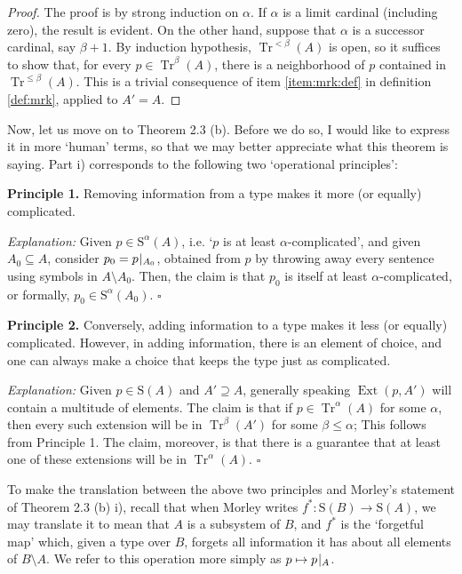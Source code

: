 \documentclass{article}
\theoremstyle{nonumberplain}
\newtheorem{proof}{Proof}
\newcommand{\Stone}{\mathrm{S}}
\DeclareMathOperator{\Tr}{Tr}
\DeclareMathOperator{\Ext}{Ext}
\newcommand{\rst}[2]{#1\mspace{1.3mu plus 0.5mu minus 0.5mu}|_{#2}}
\begin{document}
\begin{proof}
The proof is by strong induction on $\alpha$. If $\alpha$ is a limit cardinal (including zero), the result is evident. On the other hand, suppose that $\alpha$ is a successor cardinal, say $\beta + 1$. By induction hypothesis, $\Tr^{<\beta}(A)$ is open, so it suffices to show that, for every $p \in \Tr^\beta(A)$, there is a neighborhood of $p$ contained in $\Tr^{\leq\beta}(A)$. This is a trivial consequence of item \ref{item:mrk:def} in definition \ref{def:mrk}, applied to $A' = A$.
\end{proof}

Now, let us move on to Theorem 2.3 (b). Before we do so, I would like to express it in more `human' terms, so that we may better appreciate what this theorem is saying. Part i) corresponds to the following two `operational principles':

\medskip

\textbf{Principle 1.} Removing information from a type makes it more (or equally) complicated.

\smallskip

\textit{Explanation:} Given $p \in \Stone^\alpha(A)$, i.e. `$p$ is at least $\alpha$-complicated', and given $A_0 \subseteq A$, consider $p_0 = \rst p{A_0}$, obtained from $p$ by throwing away every sentence using symbols in $A \setminus A_0$. Then, the claim is that $p_0$ is itself at least $\alpha$-complicated, or formally, $p_0 \in \Stone^\alpha(A_0)$. \hfill $\square$

\medskip

\textbf{Principle 2.} Conversely, adding information to a type makes it less (or equally) complicated. However, in adding information, there is an element of choice, and one can always make a choice that keeps the type just as complicated.

\smallskip

\textit{Explanation:} Given $p \in \Stone(A)$ and $A' \supseteq A$, generally speaking $\Ext(p,A')$ will contain a multitude of elements. The claim is that if $p \in \Tr^\alpha(A)$ for some $\alpha$, then every such extension will be in $\Tr^\beta(A')$ for some $\beta\leq\alpha$; This follows from Principle 1. The claim, moreover, is that there is a guarantee that at least one of these extensions will be in $\Tr^\alpha(A)$. \hfill $\square$

\medskip

To make the translation between the above two principles and Morley's statement of Theorem 2.3 (b) i), recall that when Morley writes $f^* \colon \Stone(B) \to \Stone(A)$, we may translate it to mean that $A$ is a subsystem of $B$, and $f^*$ is the `forgetful map' which, given a type over $B$, forgets all information it has about all elements of $B \setminus A$. We refer to this operation more simply as $p \mapsto \rst pA$.
\end{document}
